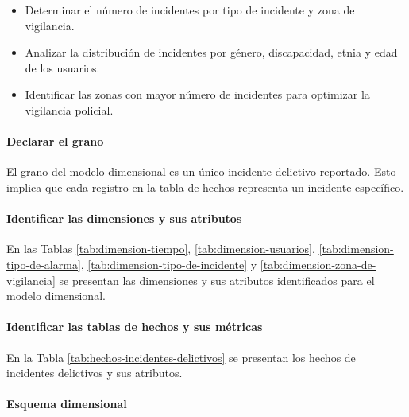 \begin{itemize}
    \item Determinar el número de incidentes por tipo de incidente y zona de vigilancia.
    \item Analizar la distribución de incidentes por género, discapacidad, etnia y edad de los usuarios.
    \item Identificar las zonas con mayor número de incidentes para optimizar la vigilancia policial.
\end{itemize}



\paragraph{Declarar el grano}

El grano del modelo dimensional es un único incidente delictivo reportado. Esto implica que cada registro en la
tabla de hechos representa un incidente específico.

\paragraph{Identificar las dimensiones y sus atributos}

En las Tablas \ref{tab:dimension-tiempo}, \ref{tab:dimension-usuarios}, \ref{tab:dimension-tipo-de-alarma},
\ref{tab:dimension-tipo-de-incidente} y \ref{tab:dimension-zona-de-vigilancia} se presentan las dimensiones y
sus atributos identificados para el modelo dimensional.



\paragraph{Identificar las tablas de hechos y sus métricas}

En la Tabla \ref{tab:hechos-incidentes-delictivos} se presentan los hechos de incidentes delictivos y sus atributos.



\paragraph{Esquema dimensional}

